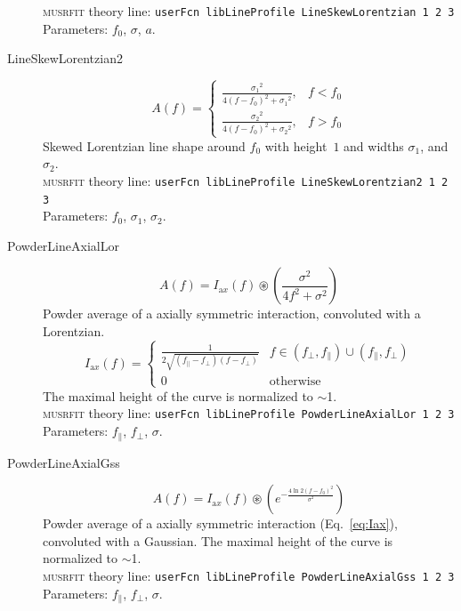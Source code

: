 \documentclass[twoside]{article}
\newcommand{\musrfit}{\textsc{musrfit}\xspace}
\begin{document}
\begin{description}
   \musrfit theory line: \verb?userFcn libLineProfile LineSkewLorentzian 1 2 3?
\\[1.5ex]
    Parameters: $f_0$, $\sigma$, $a$. 
        \item[LineSkewLorentzian2]
   \begin{equation}
    A(f)=  \left\{\begin{matrix}\frac{{\sigma_1}^2}{4{(f-f_0)}^2+{\sigma_1}^2},&f<f_0\\[9pt] \frac{{\sigma_2}^2}{4{(f-f_0)}^2+{\sigma_2}^2},&f>f_0\end{matrix}\right.
   \end{equation}
   Skewed Lorentzian line shape around $f_0$ with height~$1$ and  widths $\sigma_1$, 
 and $\sigma_2$.\\[1.5ex]
   \musrfit theory line: \verb?userFcn libLineProfile LineSkewLorentzian2 1 2 3?
\\[1.5ex]
    Parameters: $f_0$, $\sigma_1$, $\sigma_2$. 
    
    
\item[PowderLineAxialLor]
   \begin{equation}
    A(f)= I_{\mathrm ax}(f)\circledast\left( \frac{\sigma^2}{4f^2+\sigma^2} \right)
   \end{equation}
   Powder average of a axially symmetric interaction, convoluted with a Lorentzian. 
   \begin{equation}\label{eq:Iax}
      I_{\mathrm ax}(f)=\left\{\begin{matrix} \frac{1}{2\sqrt{(f_\parallel-f_\perp)(f-f_\perp)}}& f\in(f_\perp,f_\parallel)\cup(f_\parallel,f_\perp)\\[6pt] 0 & \text{otherwise}\end{matrix} \right.
   \end{equation}
   The maximal height of the curve is normalized to $\sim$1.
   \\[1.5ex]
   \musrfit theory line: \verb?userFcn libLineProfile PowderLineAxialLor 1 2 3?
\\[1.5ex]
    Parameters: $f_\parallel$, $f_\perp$, $\sigma$. 
      
\item[PowderLineAxialGss]
   \begin{equation}
    A(f)= I_{\mathrm ax}(f)\circledast\left(e^{-\frac{4\ln 2 (f-f_0)^2}{ 
\sigma^2}} \right)
   \end{equation}
   Powder average of a axially symmetric interaction (Eq.~\ref{eq:Iax}), convoluted with a Gaussian. The maximal height of the curve is normalized to $\sim$1.
   \\[1.5ex]
   \musrfit theory line: \verb?userFcn libLineProfile PowderLineAxialGss 1 2 3?
\\[1.5ex]
    Parameters: $f_\parallel$, $f_\perp$, $\sigma$. 


\end{description}
\end{document}
